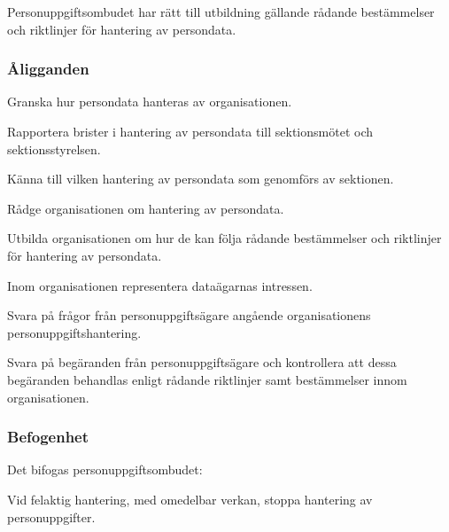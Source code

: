 Personuppgiftsombudet har rätt till utbildning gällande rådande bestämmelser och
riktlinjer för hantering av persondata.

\subsubsection{Åligganden}
\begin{att}
    \item  Granska hur persondata hanteras av organisationen.
    \item  Rapportera brister i hantering av persondata till sektionsmötet och sektionsstyrelsen.
    \item  Känna till vilken hantering av persondata som genomförs av sektionen.
    \item  Rådge organisationen om hantering av persondata.
    \item  Utbilda organisationen om hur de kan följa rådande bestämmelser och riktlinjer för hantering av persondata.
    \item  Inom organisationen representera dataägarnas intressen.
    \item  Svara på frågor från personuppgiftsägare angående organisationens personuppgiftshantering.
    \item  Svara på begäranden från personuppgiftsägare och kontrollera att dessa begäranden
behandlas enligt rådande riktlinjer samt bestämmelser innom organisationen.
\end{att}

\subsubsection{Befogenhet}
Det bifogas personuppgiftsombudet:
\begin{att}
    \item  Vid felaktig hantering, med omedelbar verkan, stoppa hantering av personuppgifter.
\end{att}